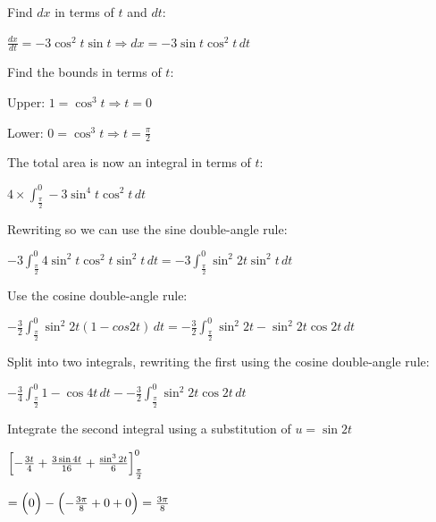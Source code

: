 \documentclass[../main.tex]{subfiles}
\begin{document}
\begin{enumerate}
\begin{spacing}{1.5}
    Find $dx$ in terms of $t$ and $dt$:

    $\frac{dx}{dt}=-3\cos^2{t}\sin{t} \Rightarrow dx=-3\sin{t}\cos^2{t}\,dt$

    Find the bounds in terms of $t$:

    Upper: $1=\cos^3{t} \Rightarrow t=0$

    Lower: $0=\cos^3{t} \Rightarrow t=\frac{\pi}{2}$

    The total area is now an integral in terms of $t$:

    $4\times\int_{\frac{\pi}{2}}^{0} -3\sin^4{t}\cos^2{t}\,dt$

    Rewriting so we can use the sine double-angle rule:

    $-3\int_{\frac{\pi}{2}}^{0}4\sin^2{t}\cos^2{t}\sin^2{t}\,dt=-3\int_{\frac{\pi}{2}}^{0} \sin^2{2t}\sin^2{t}\,dt$

    Use the cosine double-angle rule:

    $-\frac{3}{2}\int_{\frac{\pi}{2}}^{0} \sin^2{2t}(1-cos{2t})\,dt=-\frac{3}{2}\int_{\frac{\pi}{2}}^{0} \sin^2{2t}-\sin^2{2t}\cos{2t}\,dt$

    Split into two integrals, rewriting the first using the cosine double-angle rule:

    $-\frac{3}{4}\int_{\frac{\pi}{2}}^{0} 1-\cos{4t}\,dt--\frac{3}{2}\int_{\frac{\pi}{2}}^{0} \sin^2{2t}\cos{2t}\,dt$

    Integrate the second integral using a substitution of $u=\sin{2t}$

    $\Bigl[-\frac{3t}{4}+\frac{3\sin{4t}}{16}+\frac{\sin^3{2t}}{6}\Bigr]_{\frac{\pi}{2}}^{0}$

    $=\Bigl(0\Bigr)-\Bigl(-\frac{3\pi}{8}+0+0\Bigr)=\frac{3\pi}{8}$



\end{spacing}  
\end{enumerate}
\end{document}
